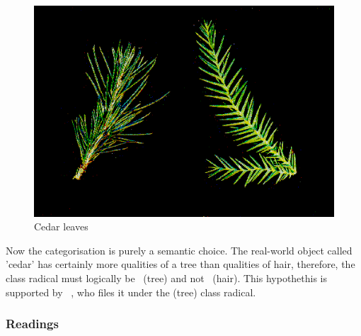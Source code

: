 \begin{figure}[htbp]
\begin{center}
\includegraphics[scale=0.4]{images/radicalStructure/cedar.png}
\caption{Cedar leaves}
\label{fig:cedarleaves}
\end{center}
\end{figure}
Now the categorisation is purely a semantic choice. The real-world object
called 'cedar' has certainly more
qualities of a tree than qualities of hair, therefore, the class radical must
logically be~ (tree) and not~ (hair).
This hypothethis is supported by
~\citeyear{Hadamitzky1995}, 
who files it under the  (tree) class radical. %

\subsubsection{Readings}
\label{sec:readings}

